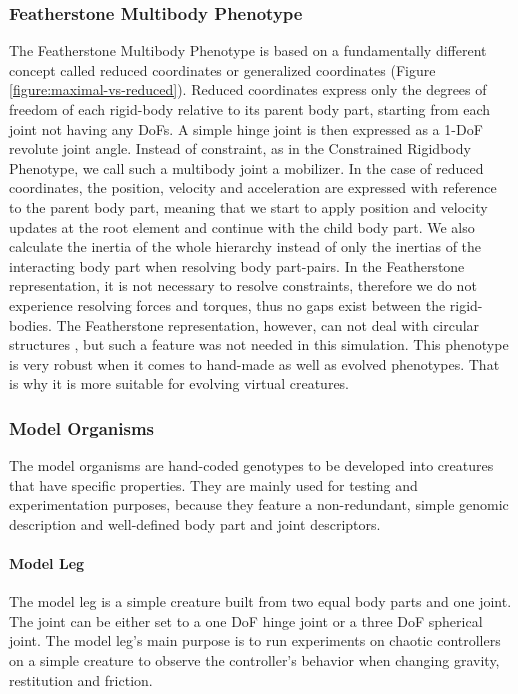 \documentclass[main]{subfiles}
\begin{document}
\subsubsection{Featherstone Multibody Phenotype}
\label{subsec:featherstone-multibody}

The Featherstone Multibody Phenotype is based on a fundamentally different concept called reduced coordinates or generalized coordinates (Figure \ref{figure:maximal-vs-reduced}). %
%
Reduced coordinates express only the degrees of freedom of each rigid-body relative to its parent body part, starting from each joint not having any DoFs. %
%
A simple hinge joint is then expressed as a 1-DoF revolute joint angle. Instead of constraint, as in the Constrained Rigidbody Phenotype, we call such a multibody joint a mobilizer. %
%
In the case of reduced coordinates, the position, velocity and acceleration are expressed with reference to the parent body part, meaning that we start to apply position and velocity updates at the root element and continue with the child body part. %
%
We also calculate the inertia of the whole hierarchy instead of only the inertias of the interacting body part when resolving body part-pairs. %
%
In the Featherstone representation, it is not necessary to resolve constraints, therefore we do not experience resolving forces and torques, thus no gaps exist between the rigid-bodies. %
%
The Featherstone representation, however, can not deal with circular structures \cite{bib::Coumans2014}, but such a feature was not needed in this simulation. %
%
This phenotype is very robust when it comes to hand-made as well as evolved phenotypes. %
%
That is why it is more suitable for evolving virtual creatures. 

\subsubsection{Model Organisms}

The model organisms are hand-coded genotypes to be developed into creatures that have specific properties. %
%
They are mainly used for testing and experimentation purposes, because they feature a non-redundant, simple genomic description and well-defined body part and joint descriptors.

\paragraph{Model Leg}

The model leg is a simple creature built from two equal body parts and one joint. %
%
The joint can be either set to a one DoF hinge joint or a three DoF spherical joint. %
%
The model leg's main purpose is to run experiments on chaotic controllers on a simple creature to observe the controller's behavior when changing gravity, restitution and friction.
\end{document}
